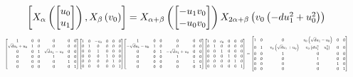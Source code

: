 \documentclass[11pt]{article}
\theoremstyle{definition}
\begin{document}
\[
\scaletoalign{\textwidth}{\left[ X_{\alpha}\left(\left[\begin{matrix}u_{0}\\u_{1}\end{matrix}\right]\right), X_{\beta}\left(v_{0}\right) \right] = X_{\alpha + \beta}\left(\left[\begin{matrix}- u_{1} v_{0}\\- u_{0} v_{0}\end{matrix}\right]\right) X_{2\alpha + \beta}\left(v_{0} \left(- d u_{1}^{2} + u_{0}^{2}\right)\right)}
\]
\[
\scaletoalign{\textwidth}{{\left[\begin{matrix}1 & 0 & 0 & 0 & 0 & 0\\\sqrt{d} u_{1} + u_{0} & 1 & 0 & 0 & 0 & 0\\0 & 0 & 1 & \sqrt{d} u_{1} - u_{0} & 0 & 0\\0 & 0 & 0 & 1 & 0 & 0\\0 & 0 & 0 & 0 & 1 & 0\\0 & 0 & 0 & 0 & 0 & 1\end{matrix}\right]} {\left[\begin{matrix}1 & 0 & - v_{0} & 0 & 0 & 0\\0 & 1 & 0 & 0 & 0 & 0\\0 & 0 & 1 & 0 & 0 & 0\\0 & 0 & 0 & 1 & 0 & 0\\0 & 0 & 0 & 0 & 1 & 0\\0 & 0 & 0 & 0 & 0 & 1\end{matrix}\right]} {\left[\begin{matrix}1 & 0 & 0 & 0 & 0 & 0\\- \sqrt{d} u_{1} - u_{0} & 1 & 0 & 0 & 0 & 0\\0 & 0 & 1 & - \sqrt{d} u_{1} + u_{0} & 0 & 0\\0 & 0 & 0 & 1 & 0 & 0\\0 & 0 & 0 & 0 & 1 & 0\\0 & 0 & 0 & 0 & 0 & 1\end{matrix}\right]} {\left[\begin{matrix}1 & 0 & v_{0} & 0 & 0 & 0\\0 & 1 & 0 & 0 & 0 & 0\\0 & 0 & 1 & 0 & 0 & 0\\0 & 0 & 0 & 1 & 0 & 0\\0 & 0 & 0 & 0 & 1 & 0\\0 & 0 & 0 & 0 & 0 & 1\end{matrix}\right]} = {\left[\begin{matrix}1 & 0 & 0 & v_{0} \left(\sqrt{d} u_{1} - u_{0}\right) & 0 & 0\\0 & 1 & - v_{0} \left(\sqrt{d} u_{1} + u_{0}\right) & v_{0} \left(d u_{1}^{2} - u_{0}^{2}\right) & 0 & 0\\0 & 0 & 1 & 0 & 0 & 0\\0 & 0 & 0 & 1 & 0 & 0\\0 & 0 & 0 & 0 & 1 & 0\\0 & 0 & 0 & 0 & 0 & 1\end{matrix}\right]}}
\]
\end{document}
